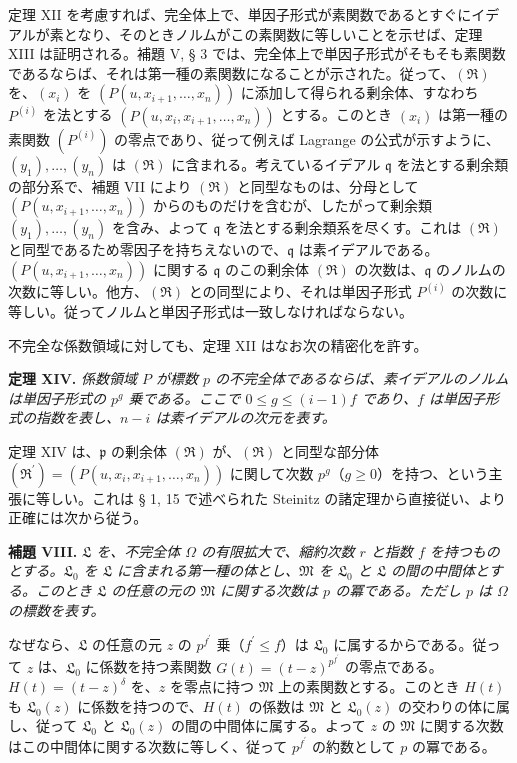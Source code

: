 \documentclass[11pt]{article}
\providecommand{\mR}{\mathfrak{R}}
\providecommand{\frakp}{\mathfrak p}
\providecommand{\frakq}{\mathfrak q}
\providecommand{\mR}{\mathfrak{R}}
\providecommand{\frakp}{\mathfrak p}
\providecommand{\frakq}{\mathfrak q}
\begin{document}
定理 XII を考慮すれば、完全体上で、単因子形式が素関数であるとすぐにイデアルが素となり、そのときノルムがこの素関数に等しいことを示せば、定理 XIII は証明される。補題 V, § 3 では、完全体上で単因子形式がそもそも素関数であるならば、それは第一種の素関数になることが示された。従って、$(\mR)$ を、$(x_i)$ を $(P(u,x_{i+1},\ldots,x_n))$ に添加して得られる剰余体、すなわち $P^{(i)}$ を法とする $(P(u,x_i,x_{i+1},\ldots,x_n))$ とする。このとき $(x_i)$ は第一種の素関数 $(P^{(i)})$ の零点であり、従って例えば Lagrange の公式が示すように、$(y_1),\ldots,(y_n)$ は $(\mR)$ に含まれる。考えているイデアル $\frakq$ を法とする剰余類の部分系で、補題 VII により $(\mR)$ と同型なものは、分母として $(P(u,x_{i+1},\ldots,x_n))$ からのものだけを含むが、したがって剰余類 $(y_1),\ldots,(y_n)$ を含み、よって $\frakq$ を法とする剰余類系を尽くす。これは $(\mR)$ と同型であるため零因子を持ちえないので、$\frakq$ は素イデアルである。$(P(u,x_{i+1},\ldots,x_n))$ に関する $\frakq$ のこの剰余体 $(\mR)$ の次数は、$\frakq$ のノルムの次数に等しい。他方、$(\mR)$ との同型により、それは単因子形式 $P^{(i)}$ の次数に等しい。従ってノルムと単因子形式は一致しなければならない。

不完全な係数領域に対しても、定理 XII はなお次の精密化を許す。

\textbf{定理 XIV.} \emph{係数領域 $P$ が標数 $p$ の不完全体であるならば、素イデアルのノルムは単因子形式の $p^g$ 乗である。ここで $0\le g\le(i-1)f$ であり、$f$ は単因子形式の指数を表し、$n-i$ は素イデアルの次元を表す。}

定理 XIV は、$\frakp$ の剰余体 $(\mR)$ が、$(\mR)$ と同型な部分体 $(\mR^{\prime})=(P(u,x_i,x_{i+1},\ldots,x_n))$ に関して次数 $p^g$（$g\ge0$）を持つ、という主張に等しい。これは § 1, 15 で述べられた Steinitz の諸定理から直接従い、より正確には次から従う。

\textbf{補題 VIII.} \emph{$\mathfrak L$ を、不完全体 $\Omega$ の有限拡大で、縮約次数 $r$ と指数 $f$ を持つものとする。$\mathfrak L_0$ を $\mathfrak L$ に含まれる第一種の体とし、$\mathfrak M$ を $\mathfrak L_0$ と $\mathfrak L$ の間の中間体とする。このとき $\mathfrak L$ の任意の元の $\mathfrak M$ に関する次数は $p$ の冪である。ただし $p$ は $\Omega$ の標数を表す。}

なぜなら、$\mathfrak L$ の任意の元 $z$ の $p^{f^{\prime}}$ 乗（$f^{\prime}\le f$）は $\mathfrak L_0$ に属するからである。従って $z$ は、$\mathfrak L_0$ に係数を持つ素関数 $G(t)=(t-z)^{p^{f^{\prime}}}$ の零点である。$H(t)=(t-z)^\delta$ を、$z$ を零点に持つ $\mathfrak M$ 上の素関数とする。このとき $H(t)$ も $\mathfrak L_0(z)$ に係数を持つので、$H(t)$ の係数は $\mathfrak M$ と $\mathfrak L_0(z)$ の交わりの体に属し、従って $\mathfrak L_0$ と $\mathfrak L_0(z)$ の間の中間体に属する。よって $z$ の $\mathfrak M$ に関する次数はこの中間体に関する次数に等しく、従って $p^{f^{\prime}}$ の約数として $p$ の冪である。
\end{document}
